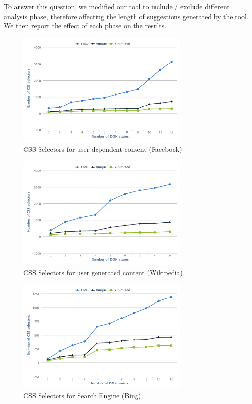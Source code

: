	 To answer this question, we modified our tool to include / exclude different analysis phase, therefore affecting the length of suggestions generated by the tool. We then report the effect of each phase on the results.
	 	
		\begin{figure}
		\centering
		\includegraphics[width=85mm]{images/facebook.pdf}
		\caption{CSS Selectors for user dependent content (Facebook)}
		\label{Fig:Facebook}
	\end{figure}
	\begin{figure}
		\centering
		\includegraphics[width=85mm]{images/wikipedia.pdf}
		\caption{CSS Selectors for user generated content (Wikipedia)}
		\label{Fig:Wikipedia}
	\end{figure}
	\begin{figure}
		\centering
		\includegraphics[width=85mm]{images/bing.pdf}
		\caption{CSS Selectors for Search Engine (Bing)}
		\label{Fig:Bing}
	\end{figure}
